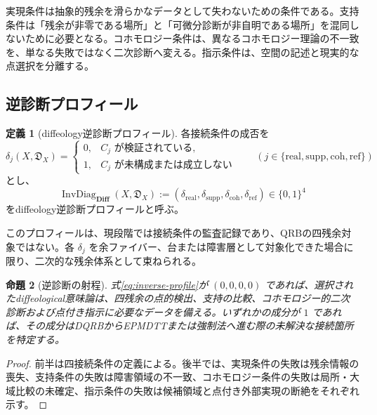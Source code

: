 \documentclass[a4paper,11pt]{ltjsarticle}
\theoremstyle{definition}
\newtheorem{definition}{定義}[section]
\theoremstyle{plain}
\newtheorem{proposition}[definition]{命題}
\newcommand{\Diff}{\mathbf{Diff}}
\begin{document}
実現条件は抽象的残余を滑らかなデータとして失わないための条件である。支持条件は「残余が非零である場所」と「可微分診断が非自明である場所」を混同しないために必要となる。コホモロジー条件は、異なるコホモロジー理論の不一致を、単なる失敗ではなく二次診断へ変える。指示条件は、空間の記述と現実的な点選択を分離する。

\subsection{逆診断プロフィール}

\begin{definition}[diffeology逆診断プロフィール]
各接続条件の成否を
\begin{equation}
 \delta_j(X,\mathfrak D_X)=
 \begin{cases}
  0,&C_j\text{ が検証されている},\\
  1,&C_j\text{ が未構成または成立しない}
 \end{cases}
 \qquad
 (j\in\{\mathrm{real},\mathrm{supp},
 \mathrm{coh},\mathrm{ref}\})
\end{equation}
とし、
\begin{equation}
 \operatorname{InvDiag}_{\Diff}(X,\mathfrak D_X)
 :=
 (\delta_{\mathrm{real}},\delta_{\mathrm{supp}},
  \delta_{\mathrm{coh}},\delta_{\mathrm{ref}})
 \in\{0,1\}^4
 \label{eq:inverse-profile}
\end{equation}
をdiffeology逆診断プロフィールと呼ぶ。
\end{definition}

このプロフィールは、現段階では接続条件の監査記録であり、QRBの四残余対象ではない。各 $\delta_j$ を余ファイバー、台または障害層として対象化できた場合に限り、二次的な残余体系として束ねられる。

\begin{proposition}[逆診断の射程]
式\eqref{eq:inverse-profile}が $(0,0,0,0)$ であれば、選択されたdiffeological意味論は、四残余の点的検出、支持の比較、コホモロジー的二次診断および点付き指示に必要なデータを備える。いずれかの成分が $1$ であれば、その成分はDQRBからEPMDTTまたは強制法へ進む際の未解決な接続箇所を特定する。
\end{proposition}

\begin{proof}
前半は四接続条件の定義による。後半では、実現条件の失敗は残余情報の喪失、支持条件の失敗は障害領域の不一致、コホモロジー条件の失敗は局所・大域比較の未確定、指示条件の失敗は候補領域と点付き外部実現の断絶をそれぞれ示す。
\end{proof}
\end{document}
